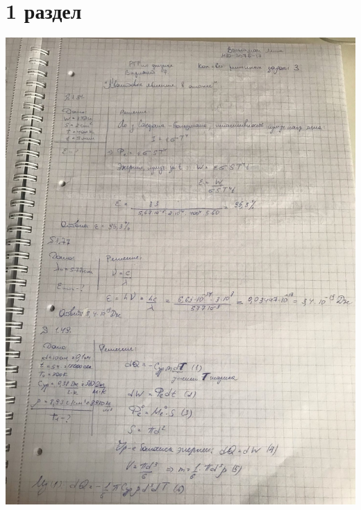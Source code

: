\documentclass[12pt]{article}
\begin{document}
\section{1 раздел}
\begin{center}
\includegraphics[scale=0.5]{1_1.jpeg}\\
\vfill

\end{center}
\end{document}
